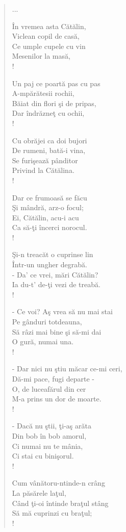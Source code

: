 \documentclass{article}
\begin{document}
\begin{small}
\begin{multicols}{3}
\begin{verse}
...

În vremea asta Cătălin, \\
Viclean copil de casă, \\
Ce umple cupele cu vin \\
Mesenilor la masă, \\!

Un paj ce poartă pas cu pas \\
A-mpărătesii rochii, \\
Băiat din flori şi de pripas, \\
Dar îndrăzneţ cu ochii, \\!

Cu obrăjei ca doi bujori \\
De rumeni, bată-i vina, \\
Se furişează pânditor \\
Privind la Cătălina. \\!

Dar ce frumoasă se făcu \\
Şi mândră, arz-o focul; \\
Ei, Cătălin, acu-i acu \\
Ca să-ţi încerci norocul. \\!

Şi-n treacăt o cuprinse lin \\
Într-un ungher degrabă. \\
- Da' ce vrei, mări Cătălin? \\
Ia du-t' de-ţi vezi de treabă. \\!

- Ce voi? Aş vrea să nu mai stai \\
Pe gânduri totdeauna, \\
Să râzi mai bine şi să-mi dai \\
O gură, numai una. \\!

- Dar nici nu ştiu măcar ce-mi ceri, \\
Dă-mi pace, fugi departe - \\
O, de luceafărul din cer \\
M-a prins un dor de moarte. \\!

- Dacă nu ştii, ţi-aş arăta \\
Din bob în bob amorul, \\
Ci numai nu te mânia, \\
Ci stai cu binişorul. \\!

Cum vânătoru-ntinde-n crâng \\
La păsărele laţul, \\
Când ţi-oi întinde braţul stâng \\
Să mă cuprinzi cu braţul; \\!


\end{verse}
\end{multicols}
\end{small}
\end{document}
